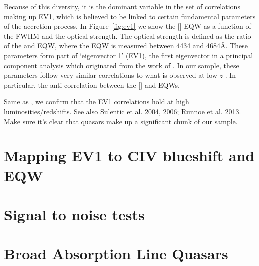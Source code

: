 Because of this diversity, it is the dominant variable in the set of correlations making up EV1, which is believed to be linked to certain fundamental parameters of the accretion process. 
In Figure~\ref{fig:ev1} we show the [] EQW as a function of the \hb FWHM and the optical  strength. 
The optical  strength is defined as the ratio of the  and \hb EQW, where the  EQW is measured between 4434 and 4684\AA.
These parameters form part of `eigenvector 1' (EV1), the first eigenvector in a principal component analysis which originated from the work of \citet{boroson92}.
In our sample, these parameters follow very similar correlations to what is observed at low-$z$ \citep[e.g.][]{shen14}.
In particular, the anti-correlation between the [] and  EQWs.  

Same as \citet{shen16a}, we confirm that the EV1 correlations hold at high luminosities/redshifts. 
See also Sulentic et al. 2004, 2006; Runnoe et al. 2013. 
Make sure it's clear that \citet{shen16a} quasars make up a significant chunk of our sample. 

\section{Mapping EV1 to CIV blueshift and EQW}


\section{Signal to noise tests}


\section{Broad Absorption Line Quasars}

